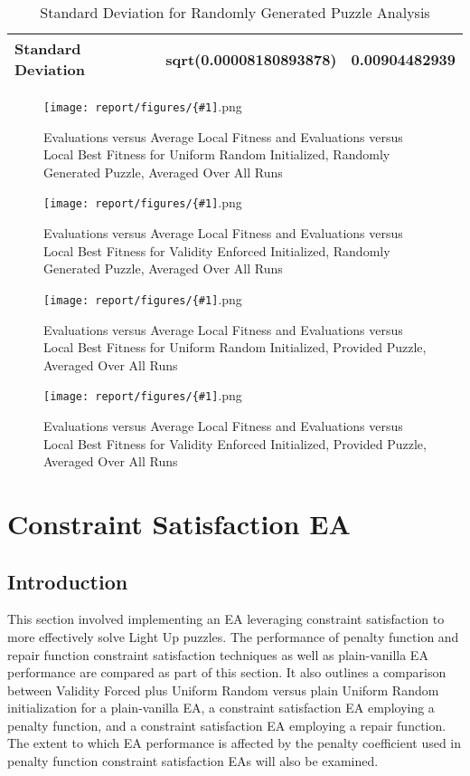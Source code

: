 \documentclass[11pt]{article}
\newcommand{\addgraphic}[1]{\centerline{\texttt{[image: report/figures/\{\#1]}.png}}}
\begin{document}
\begin{table}[H]
\centering
\caption{Standard Deviation for Randomly Generated Puzzle Analysis}
\label{bonus_table6}
\begin{tabular}{|l|l|l|}
\hline
Standard Deviation & sqrt(0.00008180893878) & 0.00904482939 \\ \hline
\end{tabular}
\end{table}


\begin{figure}[H]
    \addgraphic{random_gen_log_BONUS_graph}
    \caption{Evaluations versus Average Local Fitness and Evaluations versus Local Best Fitness for Uniform Random Initialized, Randomly Generated Puzzle, Averaged Over All Runs}
    \label{fig:std_rand_bonus}
\end{figure}

\begin{figure}[H]
    \addgraphic{random_gen_log_graph}
    \caption{Evaluations versus Average Local Fitness and Evaluations versus Local Best Fitness for Validity Enforced Initialized, Randomly Generated Puzzle, Averaged Over All Runs}
    \label{fig:std_rand_norm}
\end{figure}

\begin{figure}[H]
    \addgraphic{website_puzzle_log_BONUS_graph}
    \caption{Evaluations versus Average Local Fitness and Evaluations versus Local Best Fitness for Uniform Random Initialized, Provided Puzzle, Averaged Over All Runs}
    \label{fig:std_web_bonus}
\end{figure}

\begin{figure}[H]
    \addgraphic{website_puzzle_log_graph}
    \caption{Evaluations versus Average Local Fitness and Evaluations versus Local Best Fitness for Validity Enforced Initialized, Provided Puzzle, Averaged Over All Runs}
    \label{fig:std_web_norm}
\end{figure}


\section{Constraint Satisfaction EA}

\subsection{Introduction}

This section involved implementing an EA leveraging constraint satisfaction to
more effectively solve Light Up puzzles. The performance of
penalty function and repair function constraint satisfaction techniques as well as
plain-vanilla EA performance are compared as part of this section. It also outlines a comparison between Validity Forced plus 
Uniform Random versus plain Uniform Random initialization for a plain-vanilla EA,
a constraint satisfaction EA employing a penalty function, and a constraint satisfaction
EA employing a repair function. The extent to which EA performance is affected by 
the penalty coefficient used in penalty function constraint satisfaction EAs will also be examined.
\end{document}
